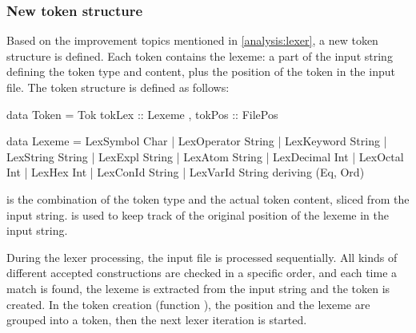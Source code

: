 \subsubsection{New token structure}
Based on the improvement topics mentioned in \autoref{analysis:lexer}, a new token structure is defined.
Each token contains the lexeme: a part of the input string defining the token type and content, plus the position of the token in the input file.
The token structure is defined as follows:

\begin{haskell}
data Token = Tok { tokLex :: Lexeme
                 , tokPos :: FilePos
                 }
                        
data Lexeme  = LexSymbol      Char
             | LexOperator    String
             | LexKeyword     String
             | LexString      String
             | LexExpl        String
             | LexAtom        String
             | LexDecimal     Int
             | LexOctal       Int
             | LexHex         Int
             | LexConId       String
             | LexVarId       String
  deriving (Eq, Ord)
\end{haskell}
%
 is the combination of the token type and the actual token content, sliced from the input string.
 is used to keep track of the original position of the lexeme in the input string.

During the lexer processing, the input file is processed sequentially.
All kinds of different accepted constructions are checked in a specific order, and each time a match is found, the lexeme is extracted from the input string and the token is created.
In the token creation (function ), the position and the lexeme are grouped into a token, then the next lexer iteration is started.
